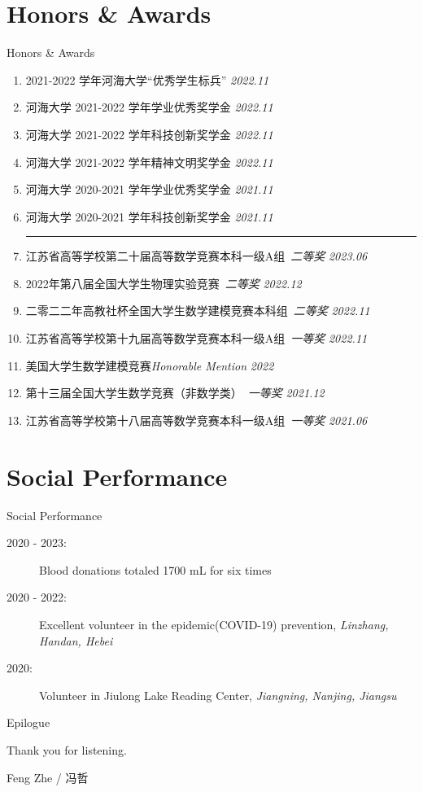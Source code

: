 \documentclass[9pt,aspectratio=169,hyperref=colorlinks]{beamer}
\begin{document}
\section{Honors \& Awards}
\begin{frame}{Honors \& Awards}
    \begin{enumerate}
        \item 2021-2022 学年河海大学“优秀学生标兵” \hfill \textit{2022.11}
        \item 河海大学 2021-2022 学年学业优秀奖学金 \hfill \textit{2022.11}
        \item 河海大学 2021-2022 学年科技创新奖学金 \hfill \textit{2022.11}
        \item 河海大学 2021-2022 学年精神文明奖学金 \hfill \textit{2022.11}
        \item 河海大学 2020-2021 学年学业优秀奖学金 \hfill \textit{2021.11}
        \item 河海大学 2020-2021 学年科技创新奖学金 \hfill \textit{2021.11}

              \medskip \hrule \medskip

        \item 江苏省高等学校第二十届高等数学竞赛本科一级A组\ \textit{二等奖} \hfill \textit{2023.06}
        \item 2022年第八届全国大学生物理实验竞赛\ \textit{二等奖}  \hfill \textit{2022.12}
        \item 二零二二年高教社杯全国大学生数学建模竞赛本科组\ \textit{二等奖} \hfill \textit{2022.11}
        \item 江苏省高等学校第十九届高等数学竞赛本科一级A组\ \textit{一等奖} \hfill \textit{2022.11}
        \item 美国大学生数学建模竞赛\textit{Honorable Mention} \hfill \textit{2022}
        \item 第十三届全国大学生数学竞赛（非数学类）\ \textit{一等奖} \hfill \textit{2021.12}
        \item 江苏省高等学校第十八届高等数学竞赛本科一级A组\ \textit{一等奖} \hfill \textit{2021.06}
    \end{enumerate}
\end{frame}

\section{Social Performance}
\begin{frame}{Social Performance}
    \begin{description}
        \item[2020 - 2023:] Blood donations totaled 1700 mL for six times
        \item[2020 - 2022:] Excellent volunteer in the epidemic(COVID-19) prevention, \textit{Linzhang, Handan, Hebei}
        \item[2020:] Volunteer in Jiulong Lake Reading Center, \textit{Jiangning, Nanjing, Jiangsu}
    \end{description}
\end{frame}

\begin{frame}{Epilogue}
    \begin{center}
        {\Huge \calligra Thank you for listening.}

        \vspace{5em}

        Feng Zhe / 冯哲
    \end{center}
\end{frame}
\end{document}
